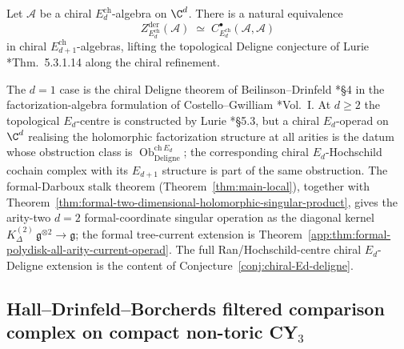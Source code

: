 \documentclass[11pt]{memoir}
\begin{document}
\begin{conj}\label{conj:chiral-Ed-deligne}
  Let \(\mathcal A\) be a chiral \(E_d^{\mathrm{ch}}\)-algebra on
  \(\C^d\).  There is a natural equivalence
  \[
    Z^{\mathrm{der}}_{E_d^{\mathrm{ch}}}(\mathcal A)
    \;\simeq\;
    C^\bullet_{E_d^{\mathrm{ch}}}(\mathcal A,\mathcal A)
  \]
  in chiral \(E_{d+1}^{\mathrm{ch}}\)-algebras, lifting the
  topological Deligne conjecture of Lurie
  \cite{lurie-ha}*{Thm.~5.3.1.14} along the chiral refinement.
\end{conj}
The \(d=1\) case is the chiral Deligne theorem of Beilinson--Drinfeld
\cite{beilinson-drinfeld-chiral}*{\S 4} in the factorization-algebra
formulation of Costello--Gwilliam \cite{costello-gwilliam}*{Vol.~I}.
At \(d\geq 2\) the topological \(E_d\)-centre is constructed by Lurie
\cite{lurie-ha}*{\S 5.3}, but a chiral \(E_d\)-operad on \(\C^d\)
realising the holomorphic factorization structure at all arities is
the datum whose obstruction class is
\(\operatorname{Ob}^{\mathrm{ch}\,E_d}_{\mathrm{Deligne}}\); the
corresponding chiral \(E_d\)-Hochschild cochain complex with its
\(E_{d+1}\) structure is part of the same obstruction.
The formal-Darboux stalk theorem (Theorem~\ref{thm:main-local}),
together with Theorem~\ref{thm:formal-two-dimensional-holomorphic-singular-product},
gives the arity-two \(d=2\) formal-coordinate singular operation as the
diagonal kernel
\(K^{(2)}_\Delta\,\mathfrak g^{\otimes 2}\to\mathfrak g\); the
formal tree-current extension is
Theorem~\ref{app:thm:formal-polydisk-all-arity-current-operad}.  The
full Ran/Hochschild-centre chiral \(E_d\)-Deligne extension is the
content of Conjecture~\ref{conj:chiral-Ed-deligne}.

\subsection{\texorpdfstring{Hall--Drinfeld--Borcherds filtered comparison complex on compact non-toric CY$_3$}{Hall-Drinfeld-Borcherds filtered comparison complex on compact non-toric CY3}}\label{ssec:open-hall-drinfeld-borcherds}
\end{document}
